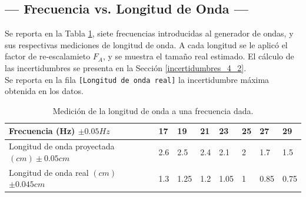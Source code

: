 \documentclass[12pt,a4paper]{article}
\begin{document}
\subsection{--- Frecuencia vs. Longitud de Onda ---} %
\label{sub:frecuencia_longitud_onda}
Se reporta en la Tabla \ref{primer_tabla}, siete frecuencias introducidas al generador de ondas, y sus respectivas mediciones de longitud de onda. A cada longitud se le aplicó el factor de re-escalamieto \(F_A\), y se muestra el tamaño real estimado. El cálculo de las incertidumbres se presenta en la Sección \ref{incertidumbres_4_2}.\\Se reporta en la fila \texttt{[Longitud de onda real]} la incertidumbre máxima obtenida en los datos.
\vspace{-6mm}
\begin{table}[ht]
	\centering 
	\caption{Medición de la longitud de onda a una frecuencia dada.}
	\begin{tabular}{|*{8}{l|}}
		\hline 
		Frecuencia (Hz) \(\pm 0.05Hz\) & 17 & 19 & 21 & 23 & 25 & 27 & 29 \\ \hline
		Longitud de onda proyectada \((cm) \pm 0.05cm\) &2.6  &2.5  &2.4  &2.1  &2    &1.7  &1.5 \\ \hline 
		Longitud de onda real \((cm)\) \(\pm 0.045cm\) &1.3  &1.25  &1.2  &1.05  &1    &0.85  &0.75 \\ \hline 
	\end{tabular}
	\label{primer_tabla}
\end{table}
\end{document}
